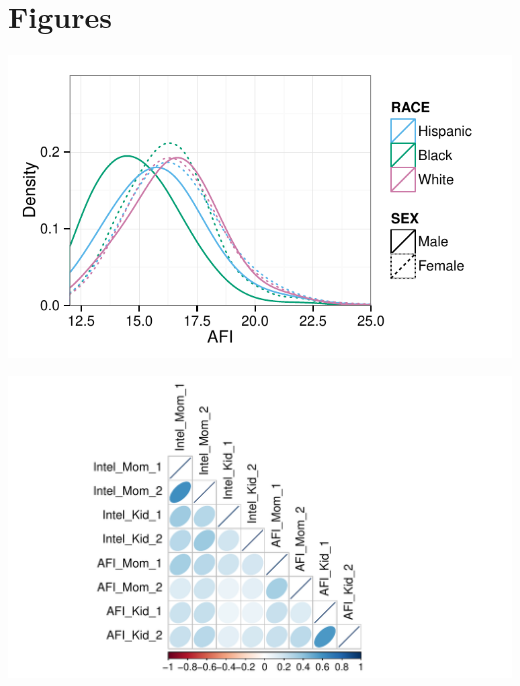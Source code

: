 \documentclass[a4paper,man,apacite,natbib,12pt,longtable]{apa6}\usepackage[]{graphicx}\usepackage[]{color}
\newenvironment{knitrout}{}{} %
\begin{document}
\section{Figures}
\begin{center}
\label{plot_afi_by_race_sex}
\begin{knitrout}
\color{fgcolor}
\includegraphics[width=.8\paperwidth]{figure/plot_afi_by_race_sex-1} 

\end{knitrout}
\end{center}
\pagebreak
%
\begin{center}
\begin{knitrout}
\color{fgcolor}
\includegraphics[width=1.1\paperwidth]{figure/plot_corplotmatrix_within-1} 

\end{knitrout}
\label{plot_within}
\end{center}
\end{document}
